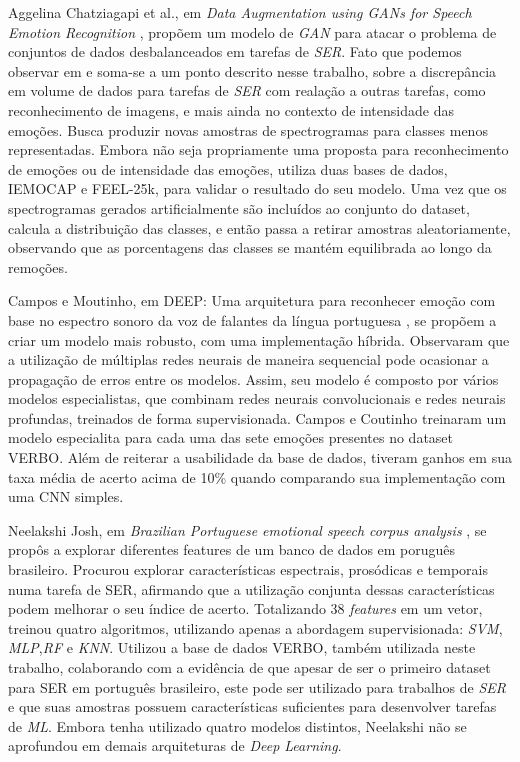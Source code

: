 Aggelina Chatziagapi et al., em \textit{Data Augmentation using GANs for Speech Emotion Recognition }\cite{32.89}, propõem um modelo de \textit{GAN} para atacar o problema de conjuntos de dados desbalanceados em tarefas de \textit{SER}. Fato que podemos observar em \cite{32.32} e soma-se a um ponto descrito nesse trabalho, sobre a discrepância em volume de dados para tarefas de \textit{SER} com realação a outras tarefas, como reconhecimento de imagens, e mais ainda no contexto de intensidade das emoções. Busca produzir novas amostras de spectrogramas para classes menos representadas. Embora não seja propriamente uma proposta para reconhecimento de emoções ou de intensidade das emoções, \cite{32.89} utiliza duas bases de dados, IEMOCAP e FEEL-25k, para validar o resultado do seu modelo. Uma vez que os spectrogramas gerados artificialmente são incluídos ao conjunto do dataset, calcula a distribuição das classes, e então passa a retirar amostras aleatoriamente, observando que as porcentagens das classes se mantém equilibrada ao longo da remoções.

Campos e Moutinho, em DEEP: Uma arquitetura para reconhecer emoção com base no espectro sonoro da voz de falantes da língua portuguesa \cite{12}, se propõem a criar um modelo mais robusto, com uma implementação híbrida. Observaram que a utilização de múltiplas redes neurais de maneira sequencial pode ocasionar a propagação de erros entre os modelos. Assim, seu modelo é composto por vários modelos especialistas, que combinam redes neurais convolucionais e redes neurais profundas, treinados de forma supervisionada. Campos e Coutinho treinaram um modelo especialita para cada uma das sete emoções presentes no dataset VERBO. Além de reiterar a usabilidade da base de dados, tiveram ganhos em sua taxa média de acerto acima de 10\% quando comparando sua implementação com uma CNN simples.

Neelakshi Josh, em \textit{Brazilian Portuguese emotional speech corpus analysis} \cite{20}, se propôs a explorar diferentes features de um banco de dados em poruguês brasileiro. Procurou explorar características espectrais, prosódicas e temporais numa tarefa de SER, afirmando que a utilização conjunta dessas características podem melhorar o seu índice de acerto. Totalizando 38 \textit{features} em um vetor, treinou quatro algoritmos, utilizando apenas a abordagem supervisionada: \textit{SVM}, \textit{MLP},\textit{RF} e \textit{KNN}. Utilizou a base de dados VERBO, também utilizada neste trabalho, colaborando com a evidência de que apesar de ser o primeiro dataset para SER em português brasileiro, este pode ser utilizado para trabalhos de \textit{SER} e que suas amostras possuem características suficientes para desenvolver tarefas de \textit{ML}. Embora tenha utilizado quatro modelos distintos, Neelakshi não se aprofundou em demais arquiteturas de \textit{Deep Learning}.

